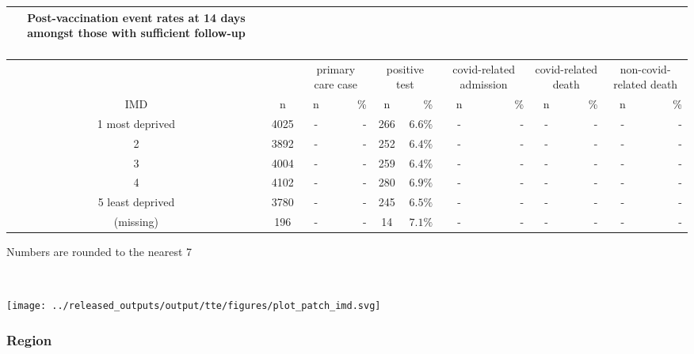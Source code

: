 \documentclass[
]{article}
\begin{document}
\captionsetup[table]{labelformat=empty,skip=1pt}
\begin{longtable}{cccrcrcrcrcr}
\caption*{
\large Post-vaccination event rates at 14 days amongst those with sufficient follow-up\\ 
\small \\ 
} \\ 
\toprule
& & \multicolumn{2}{c}{primary care case} & \multicolumn{2}{c}{positive test} & \multicolumn{2}{c}{covid-related admission} & \multicolumn{2}{c}{covid-related death} & \multicolumn{2}{c}{non-covid-related death} \\ 
 \cmidrule(lr){3-4}\cmidrule(lr){5-6}\cmidrule(lr){7-8}\cmidrule(lr){9-10}\cmidrule(lr){11-12}
IMD & n & n & \% & n & \% & n & \% & n & \% & n & \% \\ 
\midrule
1 most deprived & 4025 & - & - & 266 & $6.6\%$ & - & - & - & - & - & - \\ 
2 & 3892 & - & - & 252 & $6.4\%$ & - & - & - & - & - & - \\ 
3 & 4004 & - & - & 259 & $6.4\%$ & - & - & - & - & - & - \\ 
4 & 4102 & - & - & 280 & $6.9\%$ & - & - & - & - & - & - \\ 
5 least deprived & 3780 & - & - & 245 & $6.5\%$ & - & - & - & - & - & - \\ 
(missing) & 196 & - & - & 14 & $7.1\%$ & - & - & - & - & - & - \\ 
\bottomrule
\end{longtable}
\begin{minipage}{\linewidth}
Numbers are rounded to the nearest 7\\ 
\end{minipage}

~ ~

\texttt{[image: ../released\_outputs/output/tte/figures/plot\_patch\_imd.svg]}

\hypertarget{region}{%
\subsubsection{Region}\label{region}}
\end{document}
